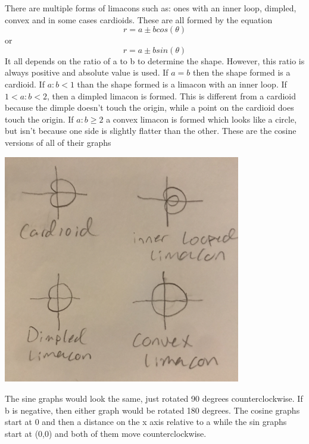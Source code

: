 \documentclass[a4paper,openright, 14pt]{article}
\begin{document}
There are multiple forms of limacons such as: ones with an inner loop, dimpled, convex and in some cases cardioids. These are all formed by the equation $$r=a\pm bcos(\theta)$$ or $$r=a\pm bsin(\theta)$$ 
It all depends on the ratio of a to b to determine the shape. However, this ratio is always positive and absolute value is used. If $a=b$ then the shape formed is a cardioid. If $a:b<1$ than the shape formed is a limacon with an inner loop. If $1<a:b<2$, then a dimpled limacon is formed. This is different from a cardioid because the dimple doesn't touch the origin, while a point on the cardioid does touch the origin. If $a:b\geq2$ a convex limacon is formed which looks like a circle, but isn't because one side is slightly flatter than the other. These are the cosine versions of all of their graphs
\begin{center}
    
\includegraphics[width = 10 cm, height = 10cm]{graphs.jpg}
\end{center}
The sine graphs would look the same, just rotated 90 degrees counterclockwise. If b is negative, then either graph would be rotated 180 degrees. The cosine graphs start at 0 and then a distance on the x axis relative to a while the sin graphs start at (0,0) and both of them move counterclockwise.
\end{document}
